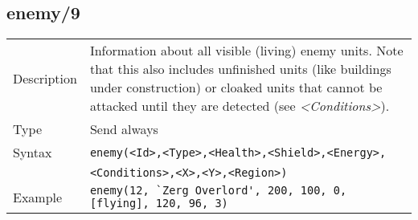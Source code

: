 \subsection{enemy/9}
\begin{tabularx}{\textwidth}{lX}
 Description & Information about all visible (living) enemy units. Note that this also includes unfinished units (like buildings under construction) or cloaked units that cannot be attacked until they are detected (see \textit{<Conditions>}). \\
 Type & Send always \\
 Syntax & \verb|enemy(<Id>,<Type>,<Health>,<Shield>,<Energy>,| \\ & \quad \verb|<Conditions>,<X>,<Y>,<Region>)| \\
 Example & \verb|enemy(12, `Zerg Overlord', 200, 100, 0, [flying], 120, 96, 3)| \\
 \end{tabularx}
